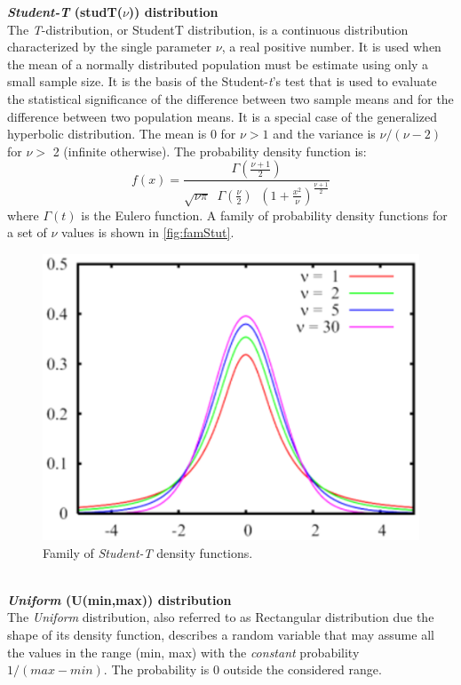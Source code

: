 \textbf{\emph{Student-T} (studT($\nu$)) distribution}\\
The \emph{T}-distribution, or StudentT distribution, is a continuous
distribution characterized by the single parameter $\nu$, a real
positive number. It is used when the mean of a normally
distributed population must be estimate using only a small sample
size. It is the basis of the Student-\emph{t}'s test that is used to
evaluate the statistical significance of the difference between
two sample means and for the difference between two population
means. It is a special case of the generalized hyperbolic
distribution. The mean is 0 for $\nu>1$ and the variance is
$\nu/(\nu-2)$ for $\nu >$ 2 (infinite otherwise). The probability
density function is:
\[ f(x) = \frac{\Gamma(\frac{\nu+1}{2})}{\sqrt{\nu \pi} \;\;
\Gamma(\frac{\nu}{2}) \;\; (1+\frac{x^2}
{\nu})^\frac{\nu+1}{2}}
\]
where $\Gamma(t)$ is the Eulero function. A family of probability
density functions for a set of $\nu$ values is shown in \autoref{fig:famStut}.
\begin{figure}[htb]
    \begin{center}
        \includegraphics[scale=.5]{img/jsimg/4.12.eps}
    \end{center}
    \caption{Family of \emph{Student-T} density functions.}
    \label{fig:famStut}
\end{figure}\\

\textbf{\emph{Uniform} (U(min,max)) distribution}\\
The \emph{Uniform} distribution, also referred to as Rectangular
distribution due the shape of its density function, describes a
random variable that may assume all the values in the range (min,
max) with the \emph{constant} probability $1/(max-min)$. The
probability is 0 outside the considered range.

